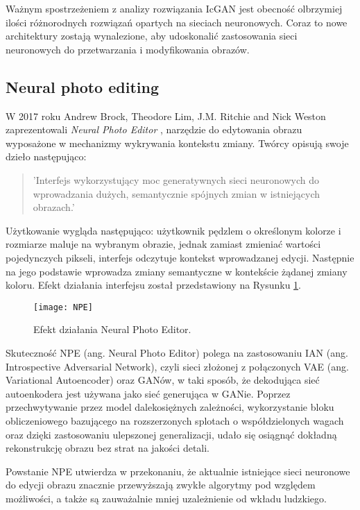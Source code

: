     Ważnym spostrzeżeniem z analizy rozwiązania IcGAN jest obecność
    olbrzymiej ilości różnorodnych rozwiązań opartych na sieciach neuronowych.
    Coraz to nowe architektury zostają wynalezione, aby udoskonalić
    zastosowania sieci neuronowych do przetwarzania i modyfikowania obrazów.

  \subsection{Neural photo editing}
    W 2017 roku Andrew Brock, Theodore Lim, J.M. Ritchie and Nick Weston
    zaprezentowali \textit{Neural Photo Editor} \cite{neural_photo_editor}, narzędzie
    do edytowania obrazu wyposażone w mechanizmy wykrywania kontekstu zmiany.
    Twórcy opisują swoje dzieło następująco:

    \begin{quote}
      'Interfejs wykorzystujący moc generatywnych sieci neuronowych do
      wprowadzania dużych, semantycznie spójnych zmian w istniejących obrazach.'
    \end{quote}

    Użytkowanie wygląda następująco: użytkownik pędzlem o określonym kolorze i
    rozmiarze maluje na wybranym obrazie, jednak zamiast zmieniać wartości
    pojedynczych pikseli, interfejs odczytuje kontekst wprowadzanej edycji.
    Następnie na jego podstawie wprowadza zmiany
    semantyczne w kontekście żądanej zmiany koloru. Efekt działania interfejsu
    został przedstawiony na Rysunku \ref{fig:npe}.

    \begin{figure}[ht]
      \centering
      \texttt{[image: NPE]}
      \caption[Efekt działania \textit{Neural Photo Editor} - źródło: \cite{neural_photo_editor}]
      {Efekt działania Neural Photo Editor.}
      \label{fig:npe}
    \end{figure}

    Skuteczność NPE (ang. Neural Photo Editor) polega na zastosowaniu IAN
    (ang. Introspective Adversarial Network), czyli sieci złożonej z połączonych
    VAE (ang. Variational Autoencoder) \cite{vae} oraz GANów, w taki sposób, że dekodująca
    sieć autoenkodera jest używana jako sieć generująca w GANie.
    Poprzez przechwytywanie przez model dalekosiężnych zależności, wykorzystanie
    bloku obliczeniowego bazującego na rozszerzonych splotach o
    współdzielonych wagach oraz dzięki zastosowaniu ulepszonej generalizacji,
    udało się osiągnąć dokładną rekonstrukcję obrazu bez strat na jakości detali.

    Powstanie NPE utwierdza w przekonaniu, że aktualnie istniejące sieci
    neuronowe do edycji obrazu znacznie przewyższają zwykłe algorytmy pod
    względem możliwości, a także są zauważalnie mniej uzależnienie od wkładu
    ludzkiego.

